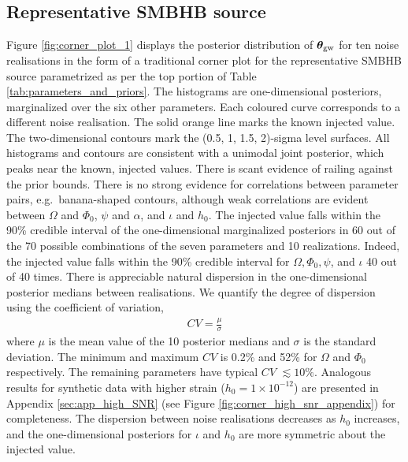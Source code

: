 \documentclass[fleqn,usenatbib,useAMS]{mnras}
\begin{document}
\subsection{Representative SMBHB source}\label{sec:rep_smbh_source}

Figure \ref{fig:corner_plot_1} displays the posterior distribution of $\boldsymbol{\theta}_{\rm gw}$ for ten noise realisations in the form of a traditional corner plot for the representative SMBHB source parametrized as per the top portion of Table \ref{tab:parameters_and_priors}. The histograms are one-dimensional posteriors, marginalized over the six other parameters. Each coloured curve corresponds to a different noise realisation. The solid orange line marks the known injected value. The two-dimensional contours mark the (0.5, 1, 1.5, 2)-sigma level surfaces. All histograms and contours are consistent with a unimodal joint posterior, which peaks near the known, injected values. There is scant evidence of railing against the prior bounds. There is no strong evidence for correlations between parameter pairs, e.g.\ banana-shaped contours, although weak correlations are evident between $\Omega$ and $\Phi_0$, $\psi$ and $\alpha$, and $\iota$ and $h_0$. The injected value falls within the 90\% credible interval of the one-dimensional marginalized posteriors in 60 out of the 70 possible combinations of the seven parameters and 10 realizations. Indeed, the injected value falls within the 90\% credible interval for $\Omega, \Phi_0, \psi$, and  $\iota$ 40 out of 40 times. There is appreciable natural dispersion in the one-dimensional posterior medians between realisations. We quantify the degree of dispersion using the coefficient of variation,
\begin{eqnarray}
	CV = \frac{\mu}{\sigma}
\end{eqnarray}
 where $\mu$ is the mean value of the 10 posterior medians and $\sigma$ is the standard deviation. The minimum and maximum $CV$ is 0.2\% and 52\% for $\Omega$ and $\Phi_0$ respectively. The remaining parameters have typical $CV$ $\lesssim 10 \%$. Analogous results for synthetic data with higher strain ($h_0 = 1 \times 10^{-12}$) are presented in Appendix \ref{sec:app_high_SNR} (see Figure \ref{fig:corner_high_snr_appendix}) for completeness. The dispersion between noise realisations decreases as $h_0$ increases, and the one-dimensional posteriors for $\iota$ and $h_0$ are more symmetric about the injected value. \newline 
\end{document}
